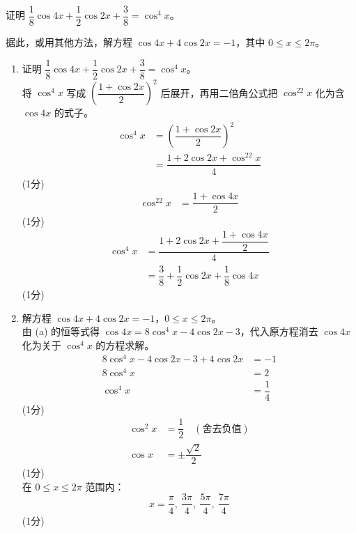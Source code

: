 \documentclass[12pt,a4paper]{exam-zh}
\newcommand{\qscoreoffset}{4em}
\newcommand{\qscore}[1]{%
    \leavevmode\unskip\nobreak\hfill
    \makebox[0pt][l]{\makebox[\qscoreoffset][r]{(#1\%)}}%
}
\begin{document}
\begin{question}[points = 6]
    \begin{questionparts}
        \item 证明 $\dfrac18\cos4x+\dfrac12\cos2x+\dfrac38=\cos^4x$。 \qscore{3}

        \item 据此，或用其他方法，解方程 $\cos4x+4\cos2x=-1$，其中 $0\leq x\leq2\pi$。 \qscore{3}
    \end{questionparts}
\end{question}

\begin{solution}
    \begin{enumerate}[label=(\alph*)]
        \item 证明 $\dfrac18\cos4x+\dfrac12\cos2x+\dfrac38=\cos^4x$。\\
        将 $\cos^4x$ 写成 $\left(\dfrac{1+\cos2x}{2}\right)^2$ 后展开，再用二倍角公式把 $\cos^22x$ 化为含 $\cos4x$ 的式子。
        \begin{align*}
            \cos^4x &= \left(\dfrac{1+\cos2x}{2}\right)^2 \\
            &= \dfrac{1+2\cos2x+\cos^22x}{4}
        \end{align*}
        \hfill (1分) \\
        \begin{align*}
            \cos^22x &= \dfrac{1+\cos4x}{2}
        \end{align*}
        \hfill (1分) \\
        \begin{align*}
            \cos^4x &= \dfrac{1+2\cos2x+\dfrac{1+\cos4x}{2}}{4} \\
            &= \dfrac38+\dfrac12\cos2x+\dfrac18\cos4x
        \end{align*}
        \hfill (1分)

        \item 解方程 $\cos4x+4\cos2x=-1$，$0\leq x\leq2\pi$。\\
        由 (a) 的恒等式得 $\cos4x=8\cos^4x-4\cos2x-3$，代入原方程消去 $\cos4x$ 化为关于 $\cos^4x$ 的方程求解。
        \begin{align*}
            8\cos^4x-4\cos2x-3+4\cos2x &= -1 \\
            8\cos^4x &= 2 \\
            \cos^4x &= \dfrac14
        \end{align*}
        \hfill (1分) \\
        \begin{align*}
            \cos^2x &= \dfrac12 \quad(\text{舍去负值}) \\
            \cos x &= \pm\dfrac{\sqrt2}{2}
        \end{align*}
        \hfill (1分) \\
        在 $0\leq x\leq2\pi$ 范围内：
        \[
            x = \dfrac{\pi}{4},\ \dfrac{3\pi}{4},\ \dfrac{5\pi}{4},\ \dfrac{7\pi}{4}
        \]
        \hfill (1分)
    \end{enumerate}
\end{solution}
\end{document}
